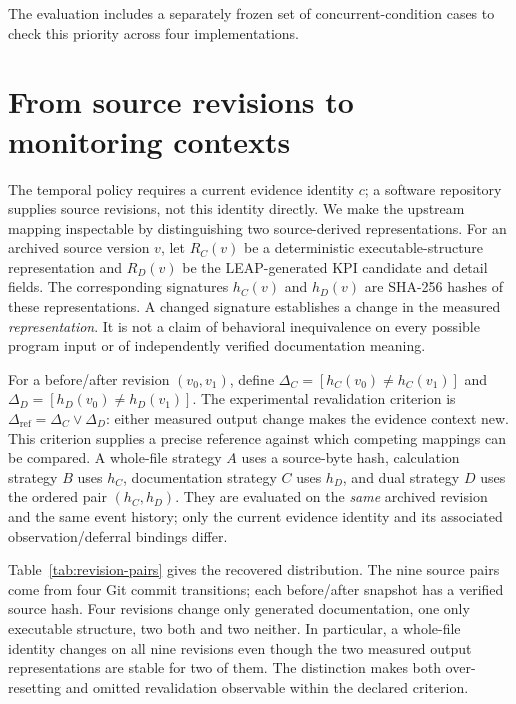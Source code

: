 \documentclass[preprint,11pt]{elsarticle}
\begin{document}
The evaluation includes a separately frozen set of concurrent-condition cases to check this priority across four implementations.

\section{From source revisions to monitoring contexts}\label{sec:source-bridge}
The temporal policy requires a current evidence identity $c$; a software repository supplies source revisions, not this identity directly. We make the upstream mapping inspectable by distinguishing two source-derived representations. For an archived source version $v$, let $R_C(v)$ be a deterministic executable-structure representation and $R_D(v)$ be the LEAP-generated KPI candidate and detail fields. The corresponding signatures $h_C(v)$ and $h_D(v)$ are SHA-256 hashes of these representations. A changed signature establishes a change in the measured \emph{representation}. It is not a claim of behavioral inequivalence on every possible program input or of independently verified documentation meaning.

For a before/after revision $(v_0,v_1)$, define $\Delta_C=[h_C(v_0)\ne h_C(v_1)]$ and $\Delta_D=[h_D(v_0)\ne h_D(v_1)]$. The experimental revalidation criterion is $\Delta_{\mathrm{ref}}=\Delta_C\lor\Delta_D$: either measured output change makes the evidence context new. This criterion supplies a precise reference against which competing mappings can be compared. A whole-file strategy $A$ uses a source-byte hash, calculation strategy $B$ uses $h_C$, documentation strategy $C$ uses $h_D$, and dual strategy $D$ uses the ordered pair $(h_C,h_D)$. They are evaluated on the \emph{same} archived revision and the same event history; only the current evidence identity and its associated observation/deferral bindings differ.

Table~\ref{tab:revision-pairs} gives the recovered distribution. The nine source pairs come from four Git commit transitions; each before/after snapshot has a verified source hash. Four revisions change only generated documentation, one only executable structure, two both and two neither. In particular, a whole-file identity changes on all nine revisions even though the two measured output representations are stable for two of them. The distinction makes both over-resetting and omitted revalidation observable within the declared criterion.
\end{document}
